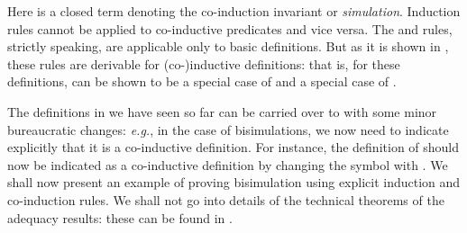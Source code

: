 \documentclass{acmtrans2m}
\begin{document}
Here  is a closed term denoting the co-induction invariant
or {\em simulation}. 
Induction rules cannot be applied to co-inductive predicates and
vice versa. The  and  rules, strictly speaking,
are applicable only to basic definitions. But as it is shown
in \cite{tiu04phd}, these rules are derivable for (co-)inductive
definitions: that is, for these definitions,  can be shown to be 
a special case of  and  a special case of .

The definitions in  we have seen so far can be carried over to
 with some minor bureaucratic changes: {\em e.g.}, in the case of bisimulations, 
we now need to indicate explicitly that it is a co-inductive definition.
For instance, the definition of  should now be indicated as 
a co-inductive definition by changing the symbol  with .
We shall now present an example of proving bisimulation using explicit
induction and co-induction rules. We shall not go into details of the technical 
theorems of the adequacy results: these can be found in \cite{tiu04phd}.
\end{document}
